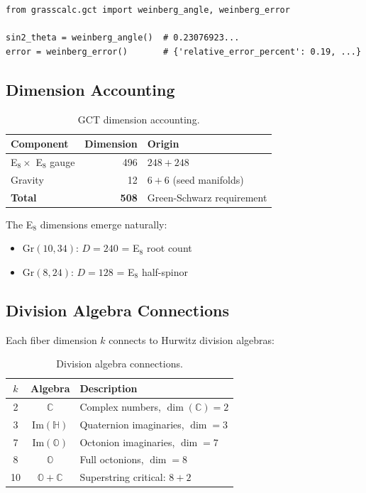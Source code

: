 \documentclass[11pt,a4paper]{article}
\newcommand{\Gr}{\mathrm{Gr}}
\newcommand{\C}{\mathbb{C}}
\newcommand{\HH}{\mathbb{H}}
\newcommand{\OO}{\mathbb{O}}
\begin{document}
\begin{lstlisting}[caption={Weinberg angle computation}]
from grasscalc.gct import weinberg_angle, weinberg_error

sin2_theta = weinberg_angle()  # 0.23076923...
error = weinberg_error()       # {'relative_error_percent': 0.19, ...}
\end{lstlisting}

\subsection{Dimension Accounting}

\begin{table}[h]
\centering
\begin{tabular}{lrl}
\toprule
\textbf{Component} & \textbf{Dimension} & \textbf{Origin} \\
\midrule
E$_8 \times$ E$_8$ gauge & 496 & $248 + 248$ \\
Gravity & 12 & $6 + 6$ (seed manifolds) \\
\midrule
\textbf{Total} & \textbf{508} & Green-Schwarz requirement \\
\bottomrule
\end{tabular}
\caption{GCT dimension accounting.}
\label{tab:dimensions}
\end{table}

The E$_8$ dimensions emerge naturally:
\begin{itemize}
    \item $\Gr(10,34)$: $D = 240$ = E$_8$ root count
    \item $\Gr(8,24)$: $D = 128$ = E$_8$ half-spinor
\end{itemize}

\subsection{Division Algebra Connections}

Each fiber dimension $k$ connects to Hurwitz division algebras:

\begin{table}[h]
\centering
\begin{tabular}{ccl}
\toprule
$k$ & \textbf{Algebra} & \textbf{Description} \\
\midrule
2 & $\C$ & Complex numbers, $\dim(\C) = 2$ \\
3 & $\mathrm{Im}(\HH)$ & Quaternion imaginaries, $\dim = 3$ \\
7 & $\mathrm{Im}(\OO)$ & Octonion imaginaries, $\dim = 7$ \\
8 & $\OO$ & Full octonions, $\dim = 8$ \\
10 & $\OO + \C$ & Superstring critical: $8 + 2$ \\
\bottomrule
\end{tabular}
\caption{Division algebra connections.}
\label{tab:algebras}
\end{table}
\end{document}
